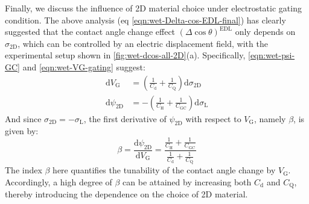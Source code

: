 Finally, we discuss the influence of 2D material choice under
electrostatic gating condition. The above analysis (eq
\autoref{eqn:wet-Delta-cos-EDL-final}) has clearly suggested that the contact
angle change effect \((\Delta \cos \theta)^{\mathrm{EDL}}\) only depends
on \(\sigma_{\mathrm{2D}}\), which can be controlled by an electric
displacement field, with the experimental setup shown in 
\autoref{fig:wet-dcos-all-2D}(a). Specifically,  \autoref{eqn:wet-psi-GC} and
\autoref{eqn:wet-VG-gating} suggest:
\begin{equation}
\label{eqn:wet-dVG-choice-2D}
\begin{aligned}
\mathrm{d} V_{\mathrm{G}} &= (\frac{1}{C_{\mathrm{d}}} + \frac{1}{C_{\mathrm{Q}}}) \mathrm{d} \sigma_{\mathrm{2D}} \\
\mathrm{d} \psi_{\mathrm{2D}} &= -(\frac{1}{C_{\mathrm{H}}} + \frac{1}{C_{\mathrm{GC}}}) \mathrm{d} \sigma_{\mathrm{L}}
\end{aligned}
\end{equation}
And since \(\sigma_{\mathrm{2D}} = -\sigma_{\mathrm{L}}\), the first
derivative of \(\psi_{\mathrm{2D}}\) with respect to \(V_{\mathrm{G}}\), namely \(\beta\), is given by:
\begin{equation}
\label{eqn:wet-def-beta}
\beta = \frac{\mathrm{d} \psi_{\mathrm{2D}}}{\mathrm{d} V_{\mathrm{G}}} 
      = \frac{\frac{1}{C_{\mathrm{H}}} + \frac{1}{C_{\mathrm{GC}}}}{\frac{1}{C_{\mathrm{d}}} + \frac{1}{C_{\mathrm{Q}}}}
\end{equation}
The index \(\beta\) here quantifies the tunability of the contact angle change
by \(V_{\mathrm{G}}\). Accordingly, a high degree of \(\beta\) can be attained by increasing both \(C_{\mathrm{d}}\) and
\(C_{\mathrm{Q}}\), thereby introducing the dependence on the choice of 2D material.

